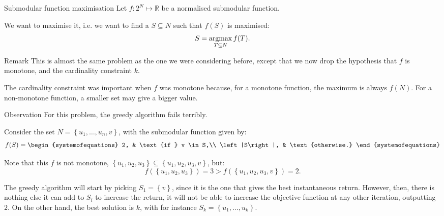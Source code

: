 \documentclass[a4paper]{article}
\begin{document}
\begin{parag}{Submodular function maximisation}
    Let $f : 2^N \mapsto \mathbb{R}$ be a normalised submodular function.

    We want to maximise it, i.e. we want to find a $S \subseteq N$ such that $f\left(S\right)$ is maximised:
    \[S = \argmax_{T \subseteq N} f\left(T\right).\] 

    \begin{subparag}{Remark}
        This is almost the same problem as the one we were considering before, except that we now drop the hypothesis that $f$ is monotone, and the cardinality constraint $k$.

        The cardinality constraint was important when $f$ was monotone because, for a monotone function, the maximum is always $f\left(N\right)$. For a non-monotone function, a smaller set may give a bigger value.
    \end{subparag}

    \begin{subparag}{Observation}
        For this problem, the greedy algorithm fails terribly.

        Consider the set $N = \left\{u_1, \ldots, u_n, v\right\}$, with the submodular function given by: 
        \[f\left(S\right) = \begin{systemofequations} 2, & \text{if } v \in S,\\ \left|S\right|, & \text{otherwise.} \end{systemofequations}\]

        Note that this $f$ is not monotone, $\left\{u_1, u_2, u_3\right\} \subseteq \left\{u_1, u_2, u_3, v\right\}$, but: 
        \[f\left(\left\{u_1, u_2, u_3\right\}\right) = 3 > f\left(\left\{u_1, u_2, u_3, v\right\}\right) = 2.\]

        The greedy algorithm will start by picking $S_1 = \left\{v\right\}$, since it is the one that gives the best instantaneous return. However, then, there is nothing else it can add to $S_i$ to increase the return, it will not be able to increase the objective function at any other iteration, outputting $2$. On the other hand, the best solution is $k$, with for instance $S_k = \left\{u_1, \ldots, u_k\right\}$.
    \end{subparag}
\end{parag}
\end{document}
